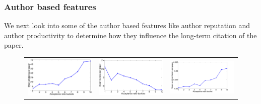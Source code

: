 \noindent
\subsubsection{Author based features}
\label{author_analysis}

We next look into some of the author based features like author reputation and author productivity to determine how they influence the long-term citation of the paper.  
\begin{figure}
\centering
\begin{tabular}{ccc}
\includegraphics[scale=0.12]{./texfiles/Chapter_4/jcdl/figures/citation_succes_ratio.eps} & \includegraphics[scale=0.15]{./texfiles/Chapter_4/jcdl/figures/review_succes_ratio.eps} & \includegraphics[scale=0.15]{./texfiles/Chapter_4/jcdl/figures/sentiment_succes_ratio-eps-converted-to.pdf}

\end{tabular}
\end{figure}
